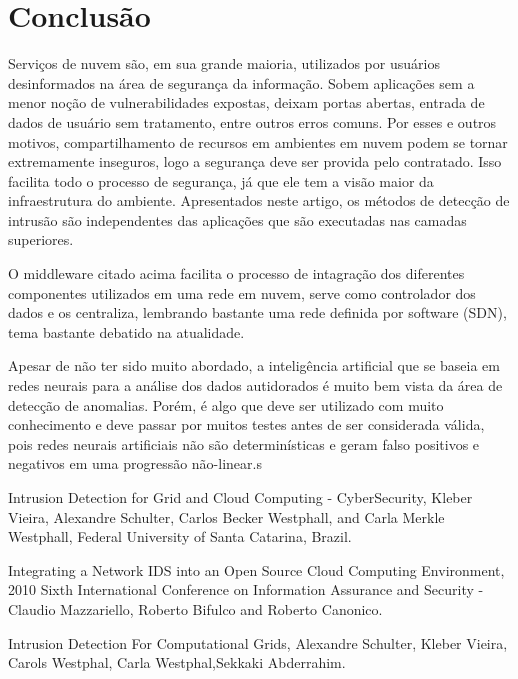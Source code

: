 \documentclass[journal]{IEEEtran}
\begin{document}
\section{Conclusão}
Serviços de nuvem são, em sua grande maioria, utilizados por usuários desinformados na área de segurança da informação. Sobem aplicações sem a menor noção de vulnerabilidades expostas, deixam portas abertas, entrada de dados de usuário sem tratamento, entre outros erros comuns. Por esses e outros motivos, compartilhamento de recursos em ambientes em nuvem podem se tornar extremamente inseguros, logo a segurança deve ser provida pelo contratado. Isso facilita todo o processo de segurança, já que ele tem a visão maior da infraestrutura do ambiente. Apresentados neste artigo, os métodos de detecção de intrusão são independentes das aplicações que são executadas nas camadas superiores. \par
O middleware citado acima facilita o processo de intagração dos diferentes componentes utilizados em uma rede em nuvem, serve como controlador dos dados e os centraliza, lembrando bastante uma rede definida por software (SDN), tema bastante debatido na atualidade. \par
Apesar de não ter sido muito abordado, a inteligência artificial que se baseia em redes neurais para a análise dos dados autidorados é muito bem vista da área de detecção de anomalias. Porém, é algo que deve ser utilizado com muito conhecimento e deve passar por muitos testes antes de ser considerada válida, pois redes neurais artificiais não são determinísticas e geram falso positivos e negativos em uma progressão não-linear.s

\begin{thebibliography}{1}

Intrusion Detection for Grid and Cloud Computing - CyberSecurity, Kleber Vieira, Alexandre Schulter, Carlos Becker Westphall, and Carla Merkle Westphall, Federal University of Santa Catarina, Brazil.

Integrating a Network IDS into an Open Source Cloud Computing Environment, 2010 Sixth International Conference on Information Assurance and Security - Claudio Mazzariello, Roberto Bifulco and Roberto Canonico.

Intrusion Detection For Computational Grids, Alexandre Schulter, Kleber Vieira, Carols Westphal, Carla Westphal,Sekkaki Abderrahim.

\end{thebibliography}
\end{document}
